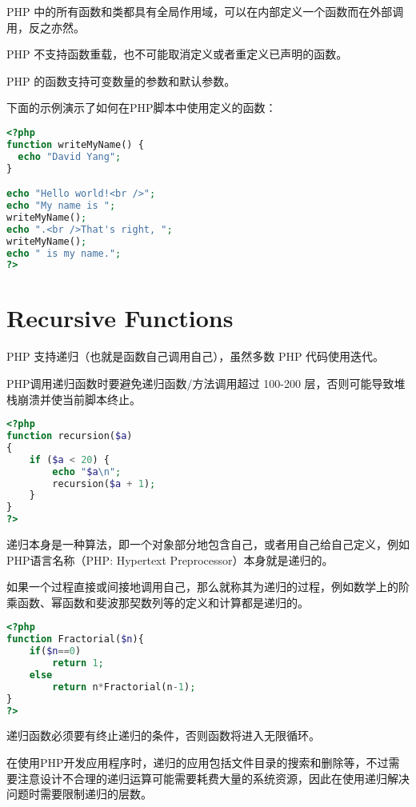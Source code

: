 PHP 中的所有函数和类都具有全局作用域，可以在内部定义一个函数而在外部调用，反之亦然。

\begin{compactitem}
\item PHP 不支持函数重载，也不可能取消定义或者重定义已声明的函数。
\item PHP 的函数支持可变数量的参数和默认参数。
\end{compactitem}



下面的示例演示了如何在PHP脚本中使用定义的函数：


\begin{lstlisting}[language=PHP]
<?php
function writeMyName() {
  echo "David Yang";
}

echo "Hello world!<br />";
echo "My name is ";
writeMyName();
echo ".<br />That's right, ";
writeMyName();
echo " is my name.";
?>
\end{lstlisting}

\section{Recursive Functions}

PHP 支持递归（也就是函数自己调用自己），虽然多数 PHP 代码使用迭代。


PHP调用递归函数时要避免递归函数/方法调用超过 100-200 层，否则可能导致堆栈崩溃并使当前脚本终止。

\begin{lstlisting}[language=PHP]
<?php
function recursion($a)
{
    if ($a < 20) {
        echo "$a\n";
        recursion($a + 1);
    }
}
?>
\end{lstlisting}

递归本身是一种算法，即一个对象部分地包含自己，或者用自己给自己定义，例如PHP语言名称（PHP: Hypertext Preprocessor）本身就是递归的。

如果一个过程直接或间接地调用自己，那么就称其为递归的过程，例如数学上的阶乘函数、幂函数和斐波那契数列等的定义和计算都是递归的。


\begin{lstlisting}[language=PHP]
<?php
function Fractorial($n){
	if($n==0)
		return 1;
	else
		return n*Fractorial(n-1);
}
?>
\end{lstlisting}

递归函数必须要有终止递归的条件，否则函数将进入无限循环。

在使用PHP开发应用程序时，递归的应用包括文件目录的搜索和删除等，不过需要注意设计不合理的递归运算可能需要耗费大量的系统资源，因此在使用递归解决问题时需要限制递归的层数。

